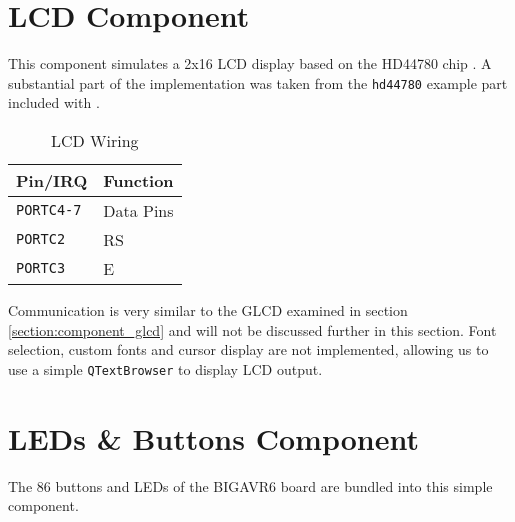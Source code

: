 \section{\acf{LCD} Component} \label{section:component_lcd}

This component simulates a 2x16 \ac{LCD} display based on the HD44780
chip \cite{hitachi01, samsung02, winstar02}. A substantial part of the implementation
was taken from the \verb|hd44780| example part included with \simavr.

\begin{table}[ht]
\centering
\begin{tabular}{ll}
\toprule

Pin/\ac{IRQ}        & Function \\

\midrule

\lstinline|PORTC4-7|& Data Pins\\
\lstinline|PORTC2|  & \acf{RS}\\
\lstinline|PORTC3|  & \acf{E}\\

\bottomrule
\end{tabular}
\caption{\ac{LCD} Wiring}
\label{tab:wiring_lcd}
\end{table}

Communication is very similar to the \ac{GLCD} examined in section
\ref{section:component_glcd} and will not be discussed further in this section.
Font selection, custom fonts and cursor display are not implemented, allowing us to use
a simple \lstinline|QTextBrowser| to display \ac{LCD} output.

\section{\acfp{LED} \& Buttons Component}

The 86 buttons and \acp{LED} of the BIGAVR6 board are bundled into this simple
component.

